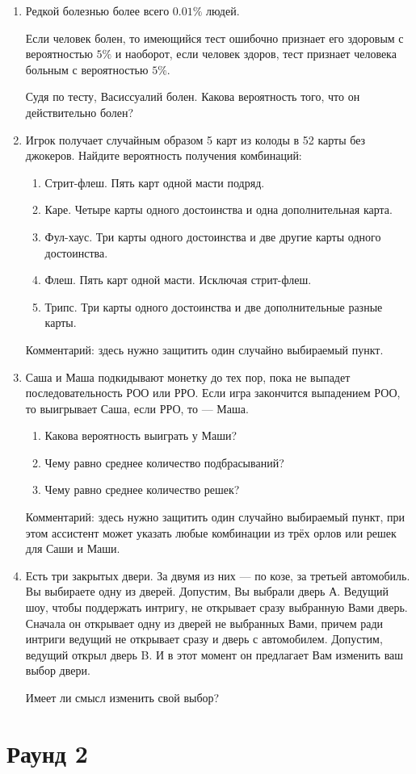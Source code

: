 \documentclass[12pt]{article}
\begin{document}
\begin{enumerate}

  \item Редкой болезнью более всего $0.01\%$ людей.

  Если человек болен, то имеющийся тест ошибочно признает его здоровым с вероятностью $5\%$
  и наоборот, если человек здоров, тест признает человека больным с вероятностью $5\%$.

  Судя по тесту, Васиссуалий болен. Какова вероятность того, что он действительно болен?

  \item Игрок получает случайным образом 5 карт из колоды в 52 карты без джокеров.
  Найдите вероятность получения комбинаций:

  \begin{enumerate}
    \item Стрит-флеш. Пять карт одной масти подряд.
    \item Каре. Четыре карты одного достоинства и одна дополнительная карта.
    \item Фул-хаус. Три карты одного достоинства и две другие карты одного достоинства.
    \item Флеш. Пять карт одной масти. Исключая стрит-флеш.
    \item Трипс. Три карты одного достоинства и две дополнительные разные карты.
  \end{enumerate}

  Комментарий: здесь нужно защитить один случайно выбираемый пункт.



  \item Саша и Маша подкидывают монетку до тех пор, пока не выпадет
 последовательность РОО или РРО. Если игра закончится выпадением
 РОО, то выигрывает Саша, если РРО, то — Маша.
 \begin{enumerate}
 \item Какова вероятность выиграть у Маши?
 \item Чему равно среднее количество подбрасываний?
 \item Чему равно среднее количество решек?
\end{enumerate}


Комментарий: здесь нужно защитить один случайно выбираемый пункт,
при этом ассистент может указать любые комбинации из трёх орлов или решек для Саши и Маши.


  \item Есть три закрытых двери. За двумя из них — по козе, за третьей автомобиль.
  Вы выбираете одну из дверей. Допустим, Вы выбрали дверь А.
  Ведущий шоу, чтобы поддержать интригу, не открывает сразу выбранную Вами дверь.
  Сначала он открывает одну из дверей не выбранных Вами,
  причем ради интриги ведущий не открывает сразу и дверь с автомобилем.
  Допустим, ведущий открыл дверь B. И в этот момент он предлагает Вам изменить ваш выбор двери.

  Имеет ли смысл изменить свой выбор?

\end{enumerate}

\section{Раунд 2}
\end{document}
